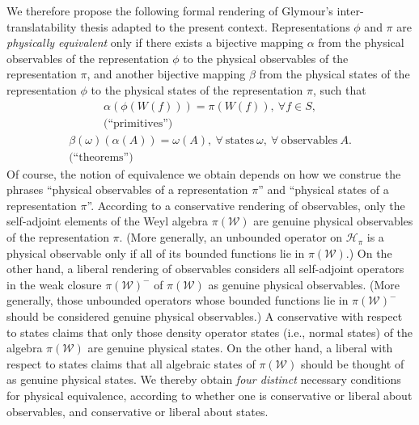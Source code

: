 \documentclass[12pt]{article}
\theoremstyle{remark}
\theoremstyle{definition}
\newcommand{\alg}[1]{\mathcal{#1}}
\newcommand{\hil}[1]{\mathcal{#1}}
\begin{document}
We therefore propose the following formal rendering of Glymour's
inter-translatability thesis adapted to the present context.
Representations $\phi$ and $\pi$ are \emph{physically equivalent} only
if there exists a bijective mapping $\alpha$ from the physical
observables of the representation $\phi$ to the physical observables
of the representation $\pi$, and another bijective mapping $\beta$
from the physical states of the representation $\phi$ to the physical
states of the representation $\pi$, such that \begin{eqnarray}
  \label{eq:x}
  \alpha(\phi(W(f)))=\pi(W(f)),\ \forall f\in S, \\
  \mbox{(``primitives'')}\ \ \ \ \ \ \ \ \ \ \ \ \ \ \nonumber
\end{eqnarray}
\begin{eqnarray}
\label{eq:y}
\beta(\omega)(\alpha(A))=\omega(A),\ \forall\ \mbox{states}\ 
\omega,\ \forall\ \mbox{observables}\ A. \\ 
\mbox{(``theorems'')}\  \ \ \ \ \ \ \ \ \ \ \ \ \ \ \ \ \ \ \ \ \ \ \ \  \nonumber
\end{eqnarray} 
Of course, the notion of equivalence we obtain depends on how we
construe the phrases ``physical observables of a representation
$\pi$'' and ``physical states of a representation $\pi$''.  According
to a conservative rendering of observables, only the self-adjoint
elements of the Weyl algebra $\pi (\alg{W})$ are genuine physical
observables of the representation $\pi$.  (More generally, an
unbounded operator on $\hil{H}_{\pi}$ is a physical observable only if
all of its bounded functions lie in $\pi (\alg{W})$.)  On the other
hand, a liberal rendering of observables considers all self-adjoint
operators in the weak closure $\pi (\alg{W})^{-}$ of $\pi (\alg{W})$
as genuine physical observables.  (More generally, those unbounded
operators whose bounded functions lie in $\pi (\alg{W})^{-}$ should be
considered genuine physical observables.)  A conservative with respect
to states claims that only those density operator states (i.e., normal
states) of the algebra $\pi (\alg{W})$ are genuine physical states.
On the other hand, a liberal with respect to states claims that all
algebraic states of $\pi (\alg{W})$ should be thought of as genuine
physical states.  We thereby obtain \emph{four distinct} necessary
conditions for physical equivalence, according to whether one is
conservative or liberal about observables, and conservative or liberal
about states.
\end{document}
